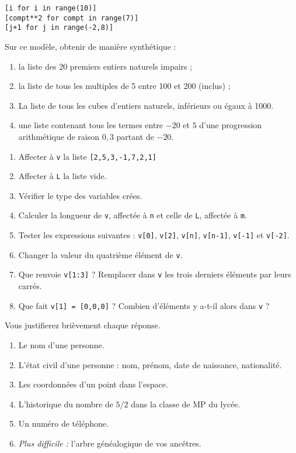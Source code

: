 \begin{lstlisting}
[i for i in range(10)]
[compt**2 for compt in range(7)]
[j+1 for j in range(-2,8)]
\end{lstlisting}
Sur ce modèle, obtenir de manière synthétique : 
\begin{enumerate}[label=\emph{\alph*)}]
  \item la liste des 20 premiers entiers naturels impairs ;
  \item la liste de tous les multiples de 5 entre 100 et 200 (inclus) ;
  \item La liste de tous les cubes d'entiers naturels, inférieurs ou égaux à 1000. 
  \item une liste contenant tous les termes entre $-20$ et $5$ d'une progression arithmétique de raison $0,3$ partant de $-20$.
\end{enumerate}

\question{}
\begin{enumerate}[label = \emph{\alph*)}]
  \item Affecter à \texttt{v} la liste \texttt{[2,5,3,-1,7,2,1]}
  \item Affecter à \texttt{L} la liste vide.
  \item Vérifier le type des variables crées.
  \item Calculer la longueur de \texttt{v}, affectée à \texttt{n} et celle de \texttt{L}, affectée à \texttt{m}.
  \item Tester les expressions suivantes : \texttt{v[0]}, \texttt{v[2]}, \texttt{v[n]}, \texttt{v[n-1]}, \texttt{v[-1]} et \texttt{v[-2]}.
  \item Changer la valeur du quatrième élément de \texttt{v}.
  \item Que renvoie \texttt{v[1:3]} ? Remplacer dans \texttt{v} les trois derniers éléments par leurs carrés.
  \item Que fait \texttt{v[1] = [0,0,0]} ? Combien d'éléments y a-t-il alors dans \texttt{v} ?
\end{enumerate}


Vous justifierez brièvement chaque réponse. 

\begin{enumerate}[label = \emph{\alph*)}]
  \item Le nom d'une personne.
  \item L'état civil d'une personne : nom, prénom, date de naissance, nationalité.
  \item Les coordonnées d'un point dans l'espace.
  \item L'historique du nombre de $5/2$ dans la classe de MP du lycée. 
  \item Un numéro de téléphone. 
  \item \emph{Plus difficile :} l'arbre généalogique de vos ancêtres. 
\end{enumerate}

